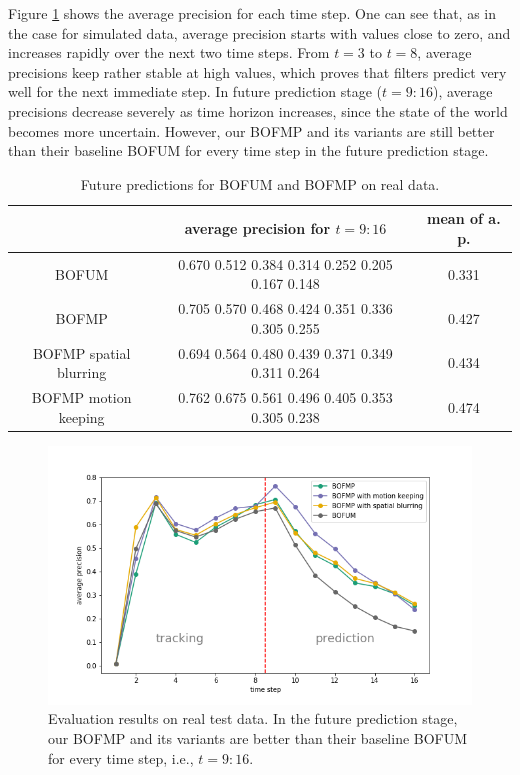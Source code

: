 Figure \ref{fig:real_test_data} shows the average precision for each time step. One can see that, as in the case for simulated data, average precision starts with values close to zero, and increases rapidly over the next two time steps. From $t=3$ to $t=8$, average precisions keep rather stable at high values, which proves that filters predict very well for the next immediate step. In future prediction stage ($t=9:16$), average precisions decrease severely as time horizon increases, since the state of the world becomes more uncertain. However, our BOFMP and its variants are still better than their baseline BOFUM for every time step in the future prediction stage.

\begin{table}[t]
\footnotesize
\centering  
\begin{tabularx}{.85\textwidth}{c|c|c}
    \hline
    & average precision for $t=9:16$ & mean of a. p. \\ \hline \hline
    BOFUM & 0.670   0.512  0.384  0.314  0.252  0.205  0.167  0.148  & 0.331   \\ \hline
    BOFMP & 0.705  0.570   0.468  0.424  0.351  0.336  0.305  0.255 & 0.427  \\
    \scriptsize{BOFMP spatial blurring} & 0.694  0.564  0.480   0.439  0.371  0.349  0.311  0.264 &  0.434  \\
    \scriptsize{BOFMP motion keeping} &  0.762  0.675  0.561  0.496  0.405  0.353  0.305  0.238 & 0.474  \\
   \hline
  \end{tabularx}
\caption{Future predictions for BOFUM and BOFMP on real data.}
\label{table:real_test_data}
\end{table}

\begin{figure}[ht]
  \centering

    \includegraphics[width=.8\textwidth]{figures/test_on_real_data.png}
    \caption[Evaluation results on real test data. ]{Evaluation results on real test data. In the future prediction stage, our BOFMP and its variants are better than their baseline BOFUM for every time step, i.e., $t=9:16$.}
    \label{fig:real_test_data}

\end{figure}


